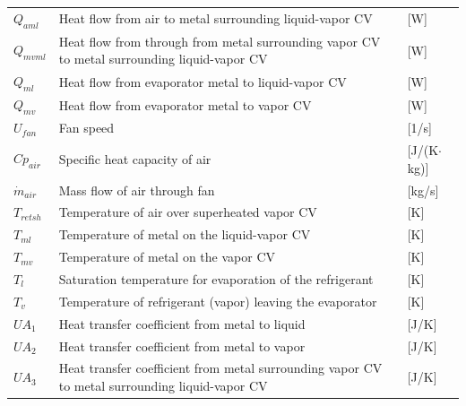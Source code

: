 \begin{center}
	\begin{tabular}{l p{10cm} l}
		$Q_{aml}$       & Heat flow from air to metal surrounding liquid-vapor CV                                        & [\si{W}]                          \\
		$Q_{mvml}$      & Heat flow from through from metal surrounding vapor CV to metal surrounding liquid-vapor CV    & [\si{W}]                          \\
		$Q_{ml}$        & Heat flow from evaporator metal to liquid-vapor CV                                             & [\si{W}]                          \\
		$Q_{mv}$        & Heat flow from evaporator metal to vapor CV                                                    & [\si{W}]                          \\
		$U_{fan}$       & Fan speed                                                                                      & [1/\si{s}]                        \\
		$Cp_{air}$      & Specific heat capacity of air                                                                  & [\si{J}/(\si{K}$ \cdot $\si{kg})] \\
		$\dot{m}_{air}$ & Mass flow of air through fan                                                                   & [\si{kg}/\si{s}]                  \\
		$T_{retsh}$     & Temperature of air over superheated vapor CV                                                   & [\si{K}]                          \\
		$T_{ml}$        & Temperature of metal on the liquid-vapor CV                                                    & [\si{K}]                          \\
		$T_{mv}$        & Temperature of metal on the vapor CV                                                           & [\si{K}]                          \\
		$T_{l}$         & Saturation temperature for evaporation of the refrigerant                                      & [\si{K}]                          \\
		$T_{v}$         & Temperature of refrigerant (vapor) leaving the evaporator                                      & [\si{K}]                          \\
		$UA_1$          & Heat transfer coefficient from metal to liquid                                                 & [\si{J}/\si{K}]                   \\
		$UA_2$          & Heat transfer coefficient from metal to vapor                                                  & [\si{J}/\si{K}]                   \\
		$UA_3$          & Heat transfer coefficient from metal surrounding vapor CV to metal surrounding liquid-vapor CV & [\si{J}/\si{K}]
	\end{tabular}
\end{center}

